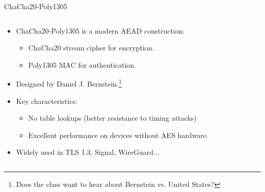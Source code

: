 \documentclass[aspectratio=169, lualatex, handout]{beamer}
\begin{document}
\begin{frame}{ChaCha20-Poly1305}
	\begin{columns}[c]
		\begin{column}{0.6\textwidth}
			\begin{itemize}[<+->]
				\item ChaCha20-Poly1305 is a modern AEAD construction:
				      \begin{itemize}
					      \item ChaCha20 stream cipher for encryption.
					      \item Poly1305 MAC for authentication.
				      \end{itemize}
				\item Designed by Daniel J. Bernstein.\footnote{Does the class want to hear about Bernstein vs. United States?}
				\item Key characteristics:
				      \begin{itemize}
					      \item No table lookups (better resistance to timing attacks)
					      \item Excellent performance on devices without AES hardware.
				      \end{itemize}
				\item Widely used in TLS 1.3, Signal, WireGuard...
			\end{itemize}
		\end{column}
		\begin{column}{0.4\textwidth}
			\begin{center}
			\end{center}
		\end{column}
	\end{columns}
\end{frame}
\end{document}
